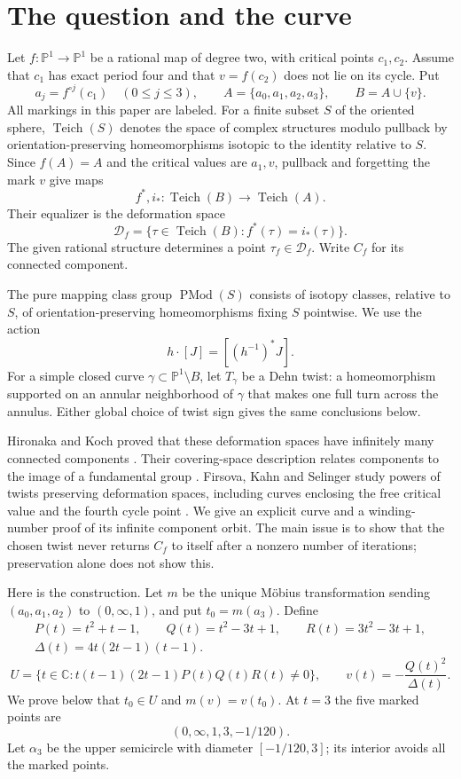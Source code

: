 \documentclass[11pt]{article}
\newcommand{\C}{\mathbb C}
\newcommand{\Pone}{\mathbb P^1}
\newcommand{\Teich}{\operatorname{Teich}}
\newcommand{\Mod}{\operatorname{PMod}}
\newcommand{\D}{\mathcal D}
\theoremstyle{remark}
\begin{document}
\section{The question and the curve}
Let $f:\Pone\to\Pone$ be a rational map of degree two, with critical points $c_1,c_2$. Assume that $c_1$ has exact period four and that $v=f(c_2)$ does not lie on its cycle. Put
\[
 a_j=f^{\circ j}(c_1)\quad(0\leq j\leq3),\qquad
 A=\{a_0,a_1,a_2,a_3\},\qquad B=A\cup\{v\}.
\]
All markings in this paper are labeled. For a finite subset $S$ of the oriented sphere, $\Teich(S)$ denotes the space of complex structures modulo pullback by orientation-preserving homeomorphisms isotopic to the identity relative to $S$. Since $f(A)=A$ and the critical values are $a_1,v$, pullback and forgetting the mark $v$ give maps
\[
 f^*,i_*:\Teich(B)\longrightarrow\Teich(A).
\]
Their equalizer is the deformation space
\begin{equation}\label{eq:def}
 \D_f=\{\tau\in\Teich(B):f^*(\tau)=i_*(\tau)\}.
\end{equation}
The given rational structure determines a point $\tau_f\in\D_f$. Write $C_f$ for its connected component.

The pure mapping class group $\Mod(S)$ consists of isotopy classes, relative to $S$, of orientation-preserving homeomorphisms fixing $S$ pointwise. We use the action
\[
 h\cdot[J]=[(h^{-1})^*J].
\]
For a simple closed curve $\gamma\subset\Pone\setminus B$, let $T_\gamma$ be a Dehn twist: a homeomorphism supported on an annular neighborhood of $\gamma$ that makes one full turn across the annulus. Either global choice of twist sign gives the same conclusions below.

Hironaka and Koch proved that these deformation spaces have infinitely many connected components \cite[Theorem 1.3]{HK}. Their covering-space description relates components to the image of a fundamental group \cite[Section 3.2]{HK}. Firsova, Kahn and Selinger study powers of twists preserving deformation spaces, including curves enclosing the free critical value and the fourth cycle point \cite[Lemmas 5.3 and 5.5, Section 6.1]{FKS}. We give an explicit curve and a winding-number proof of its infinite component orbit. The main issue is to show that the chosen twist never returns $C_f$ to itself after a nonzero number of iterations; preservation alone does not show this.

Here is the construction. Let $m$ be the unique M\"obius transformation sending $(a_0,a_1,a_2)$ to $(0,\infty,1)$, and put $t_0=m(a_3)$. Define
\begin{gather*}
 P(t)=t^2+t-1,\qquad Q(t)=t^2-3t+1,\qquad R(t)=3t^2-3t+1,\\
 \Delta(t)=4t(2t-1)(t-1).
\end{gather*}
\begin{equation}\label{eq:U}
 U=\{t\in\C:t(t-1)(2t-1)P(t)Q(t)R(t)\ne0\},
 \qquad v(t)=-\frac{Q(t)^2}{\Delta(t)}.
\end{equation}
We prove below that $t_0\in U$ and $m(v)=v(t_0)$. At $t=3$ the five marked points are
\[
 (0,\infty,1,3,-1/120).
\]
Let $\alpha_3$ be the upper semicircle with diameter $[-1/120,3]$; its interior avoids all the marked points.
\end{document}
